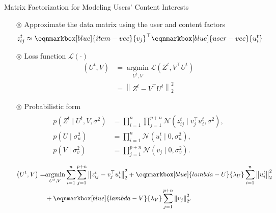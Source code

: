 \documentclass{beamer}
\begin{document}
\begin{frame}[allowframebreaks]{Matrix Factorization for Modeling Users' Content Interests}
	\begin{itemize}
		\item[$\circledcirc$] Approximate the data matrix using the user and content factors
		      \begin{equation*}
			      z_{i j}^t \approx \eqnmarkbox[blue]{item-vec}{v_j}^{\top} \eqnmarkbox[blue]{user-vec}{u_i^t}
		      \end{equation*}
		\item[$\circledcirc$] Loss function $\mathcal{L}(\cdot)$
		      \begin{align*}
			      \left(U^t, V\right)&=\underset{U^t, V}{\operatorname{argmin}} \mathcal{L}\left(Z^t, V^{\top} U^t\right) \\
			      &=\left\|Z^t-V^{\top} U^t\right\|_2^2
		      \end{align*}
		\item[$\circledcirc$] Probabilistic form
		      \begin{align*}
			      \begin{aligned}
				      p\left(Z^t \mid U^t, V, \sigma^2\right) & =\prod_{i=1}^n \prod_{j=1}^{p+n} \mathcal{N}\left(z_{i j}^t \mid v_j^{\top} u_i^t, \sigma^2\right), \\
				      p\left(U \mid \sigma_u^2\right) & =\prod_{i=1}^n \mathcal{N}\left(u_i^t \mid 0, \sigma_u^2\right), \\
				      p\left(V \mid \sigma_v^2\right) & =\prod_{j=1}^{p+n} \mathcal{N}\left(v_j \mid 0, \sigma_v^2\right) .
			      \end{aligned}
		      \end{align*}
		      \begin{align*}
			      \begin{aligned}
				      \left(U^t, V\right)= & \underset{U^t, V}{\operatorname{argmin}} \sum_{i=1}^n \sum_{j=1}^{p+n}\left\|z_{i j}^t-v_j^{\top} u_i^t\right\|_2^2+\eqnmarkbox[blue]{lambda-U}{\lambda_U} \sum_{i=1}^n\left\|u_i^t\right\|_2^2 \\
				      & +\eqnmarkbox[blue]{lambda-V}{\lambda_V} \sum_{j=1}^{p+n}\left\|v_j\right\|_{2^{\prime}}^2
			      \end{aligned}
		      \end{align*}


\end{itemize}
\end{frame}
\end{document}

